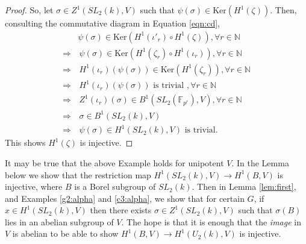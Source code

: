 \begin{proof}
So, let $\sigma \in Z^1(SL_2(k), V)$ such that $\psi(\sigma) \in \mathrm{Ker}\left(H^1(\zeta)\right)$.
Then, consulting the commutative diagram in Equation \ref{eqn:cd},
\begin{align*}
	&\psi(\sigma) \in \mathrm{Ker}\left(H^1(\iota'_r) \circ H^1(\zeta)\right), \forall r \in \mathbb{N} \\
	\Rightarrow &\,\psi(\sigma) \in \mathrm{Ker}\left(H^1(\zeta_r) \circ H^1(\iota_r)\right), \forall r \in \mathbb{N}  \\
	\Rightarrow &\,H^1(\iota_r)(\psi(\sigma)) \in \mathrm{Ker}\left(H^1(\zeta_r)\right), \forall r \in \mathbb{N}  \\
	\Rightarrow &\,H^1(\iota_r)(\psi(\sigma))\textrm{ is trivial }, \forall r \in \mathbb{N} \\%
	\Rightarrow &\,Z^1(\iota_r)(\sigma) \in B^1(SL_2(\mathbb{F}_{p^r}), V), \forall r \in \mathbb{N}  \\
	\Rightarrow &\,\sigma \in B^1(SL_2(k), V) \\ %
	\Rightarrow &\,\psi(\sigma) \in H^1(SL_2(k), V) \textrm{ is trivial}.
\end{align*}
This shows $H^1(\zeta)$ is injective.
\end{proof}

\begin{remark}
It may be true that the above Example holds for unipotent $V$. In the Lemma below we show that the restriction map $H^1(SL_2(k), V) \rightarrow  H^1(B, V)$ is injective, where $B$ is a Borel subgroup of $SL_2(k)$. Then in Lemma \ref{lem:first}, and Examples \ref{g2:alpha} and \ref{c3:alpha}, we show that for certain $G$, if $x\in H^1(SL_2(k), V)$ then there exists $\sigma\in Z^1(SL_2(k), V)$ such that $\sigma\left(B\right)$ lies in an abelian subgroup of $V$. The hope is that it is enough that the \emph{image} in $V$ is abelian to be able to show $H^1(B, V)\rightarrow H^1(U_2(k), V)$ is injective.
\end{remark}

